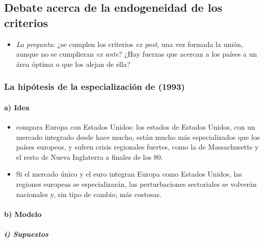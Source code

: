 \documentclass[11pt]{article}
\begin{document}
\subsection{Debate acerca de la endogeneidad de los criterios}\label{sec:endogeneidad}

\begin{itemize}
\item \emph{La pregunta}: ¿se cumplen los criterios \emph{ex post}, una vez formada la unión, aunque no se cumplieran \emph{ex ante}? ¿Hay fuerzas que acercan a los países a un área óptima o que los alejan de ella?
\end{itemize}

\subsubsection{La hipótesis de la especialización de  (1993)}\label{sec:krugman}

\paragraph{a) Idea}

\begin{itemize}
\item \textcite{Krugman1993Lessons} compara Europa con Estados Unidos: los estados de Estados Unidos, con un mercado integrado desde hace mucho, están mucho más especializados que los países europeos, y sufren crisis regionales fuertes, como la de Massachusetts y el resto de Nueva Inglaterra a finales de los 80.
\item Si el mercado único y el euro integran Europa como Estados Unidos, las regiones europeas se especializarán, las perturbaciones sectoriales se volverán nacionales y, sin tipo de cambio, más costosas.
\end{itemize}

\paragraph{b) Modelo}

\subparagraph{i) Supuestos}
\end{document}
